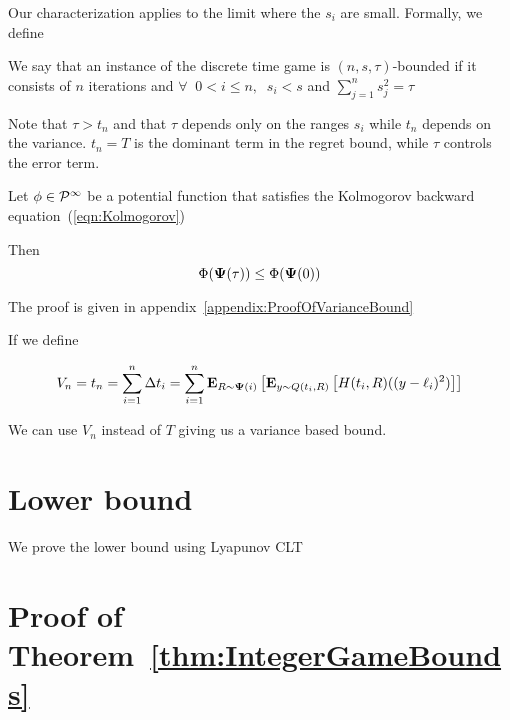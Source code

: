 \documentclass{article}[12pt]
\begin{document}
Our characterization applies to the limit where the $s_i$ are small. Formally, we define
\begin{definition}
We say that an instance of the discrete time game is
$(n,s,\tau)$-bounded if it consists of $n$ iterations and $\forall\;\; 0<i\leq n,\;\; s_i < s$ and $\sum_{j=1}^n s_j^2=\tau$
\end{definition}

Note that $\tau>t_n$ and that $\tau$ depends only on the ranges $s_i$
while $t_n$ depends on the variance. $t_n = T$ 
is the dominant term in the regret bound, while $\tau$ controls the
error term.

\fi

\begin{theorem} \label{thm:variancebound} Let $\phi \in {\cal P}^{\infty}$
  be a potential function that satisfies the Kolmogorov backward
  equation~(\ref{eqn:Kolmogorov})

Then 
$$\Phi({\bf \Psi}(\tau)) \leq \Phi({\bf \Psi}(0))$$
\end{theorem}

The proof is given in appendix~\ref{appendix:ProofOfVarianceBound}

If we define

\begin{equation} \label{eqn:Vn}
  V_n = t_n = \sum_{i=1}^n \Delta t_i= 
  \sum_{i=1}^n {\bf E}_{R \sim {\bf \Psi}(i)}\left[ {\bf E}_{y \sim Q(t_i,R)}\left[ H(t_i,R) ((y-\ell_i)^2) \right] \right]
\end{equation}

We can use $V_n$ instead of $T$ giving us a variance based bound.

  

\section{Lower bound} \label{sec:lowerbound}

We prove the lower bound using Lyapunov CLT ~\cite{billingsley1995central}





\appendix
\section{Proof of Theorem~\ref{thm:IntegerGameBounds}}
\end{document}
